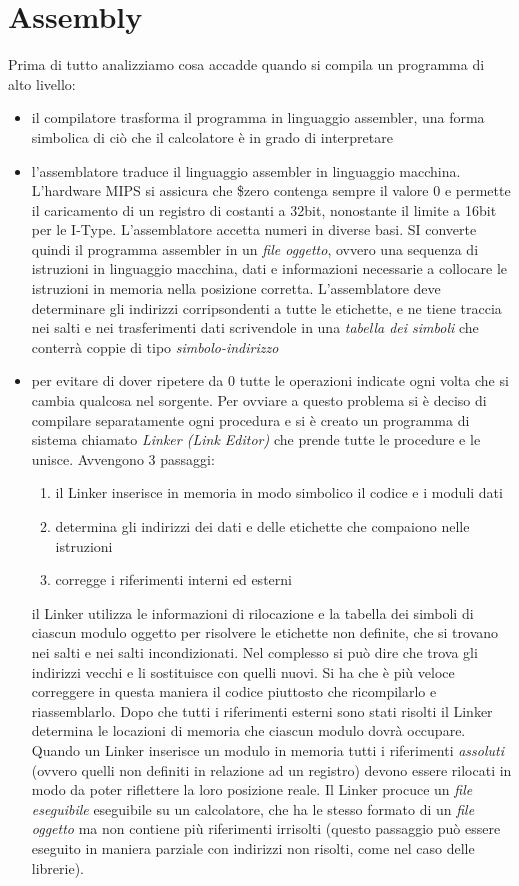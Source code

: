 \documentclass[a4paper,12pt, oneside]{book}
\begin{document}
\chapter{Assembly}
Prima di tutto analizziamo cosa accadde quando si compila un programma di alto livello:
\begin{itemize} 
\item il compilatore trasforma il programma in linguaggio assembler, una forma simbolica di ciò che il calcolatore è in grado di interpretare 
\item l'assemblatore traduce il linguaggio assembler in linguaggio macchina. L'hardware MIPS si assicura che \$zero contenga sempre il valore 0 e permette il caricamento di un registro di costanti a 32bit, nonostante il limite a 16bit per le I-Type. L'assemblatore accetta numeri in diverse basi. SI converte quindi il programma assembler in un \textit{file oggetto}, ovvero una sequenza di istruzioni in linguaggio macchina, dati e informazioni necessarie a collocare le istruzioni in memoria nella posizione corretta. L'assemblatore deve determinare gli indirizzi corripsondenti a tutte le etichette, e ne tiene traccia nei salti e nei trasferimenti dati scrivendole in una \textit{tabella dei simboli} che conterrà coppie di tipo \textit{simbolo-indirizzo}
\item per evitare di dover ripetere da 0 tutte le operazioni indicate ogni volta che si cambia qualcosa nel sorgente. Per ovviare a questo problema si è deciso di compilare separatamente ogni procedura e si è creato un programma di sistema chiamato \textit{Linker (Link Editor)} che prende tutte le procedure e le unisce. Avvengono 3 passaggi:
\begin{enumerate}
\item il Linker inserisce in memoria in modo simbolico il codice e i moduli dati
\item determina gli indirizzi dei dati e delle etichette che compaiono nelle istruzioni 
\item corregge i riferimenti interni ed esterni
\end{enumerate}
il Linker utilizza le informazioni di rilocazione e la tabella dei simboli di ciascun modulo oggetto per risolvere le etichette non definite, che si trovano nei salti e nei salti incondizionati. Nel complesso si può dire che trova gli indirizzi vecchi e li sostituisce con quelli nuovi. Si ha che è più veloce correggere in questa maniera il codice piuttosto che ricompilarlo e riassemblarlo. Dopo che tutti i riferimenti esterni sono stati risolti il Linker determina le locazioni di memoria che ciascun modulo dovrà occupare. Quando un Linker inserisce un modulo in memoria tutti i riferimenti \textit{assoluti} (ovvero quelli non definiti in relazione ad un registro) devono essere rilocati in modo da poter riflettere la loro posizione reale. Il Linker procuce un \textit{file eseguibile} eseguibile su un calcolatore, che ha le stesso formato di un \textit{file oggetto} ma non contiene più riferimenti irrisolti (questo passaggio può essere eseguito in maniera parziale con indirizzi non risolti, come nel caso delle librerie).


\end{itemize}
\end{document}
